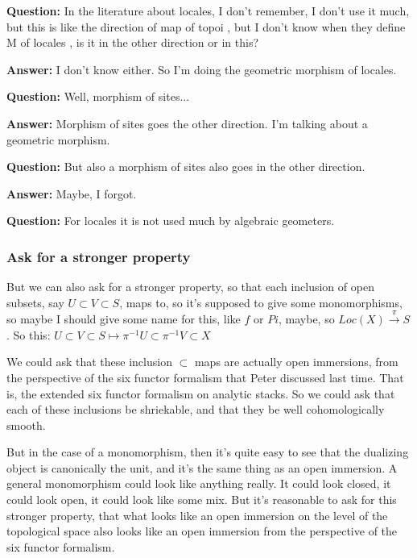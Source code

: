 \textbf{Question:} In the literature about locales, I don't remember, I don't use it much, but this is like the direction of map of topoi \citeme{}, but I don't know when they define M of locales , is it in the other direction or in this? 

\textbf{Answer:} I don't know either. So I'm doing the geometric morphism of locales. 

\textbf{Question:} Well, morphism of sites...

\textbf{Answer:} Morphism of sites goes the other direction. I'm talking about a geometric morphism. 

\textbf{Question:} But also a morphism of sites  also goes in the other direction.

\textbf{Answer:} Maybe, I forgot.

\textbf{Question:} For locales it is not used much by algebraic geometers.

\subsubsection{Ask for a stronger property} \label{subsubsec:ask_for_a_stronger_property}
But we can also ask for a stronger property, so that each inclusion of open subsets, say $ U \subset V \subset S$, maps to, so it's supposed to give some monomorphisms, so maybe I should give some name for this, like $f$ or $Pi$, maybe, so $Loc(X) \xrightarrow{\pi} S$. So this: $

U \subset V \subset S \mapsto \pi^{-1} U \subset \pi^{-1} V \subset X

$

We could ask that these inclusion $\subset$ maps are actually open immersions, from the perspective of the six functor formalism that Peter discussed last time. That is, the extended six functor formalism on analytic stacks. So we could ask that each of these inclusions be shriekable, and that they be well cohomologically smooth.

But in the case of a monomorphism, then it's quite easy to see that the dualizing object is canonically the unit, and it's the same thing as an open immersion. 
A general monomorphism could look like anything really. It could look closed, it could look open, it could look like some mix. But it's reasonable to ask for this stronger property, that what looks like an open immersion on the level of the topological space also looks like an open immersion from the perspective of the six functor formalism.

